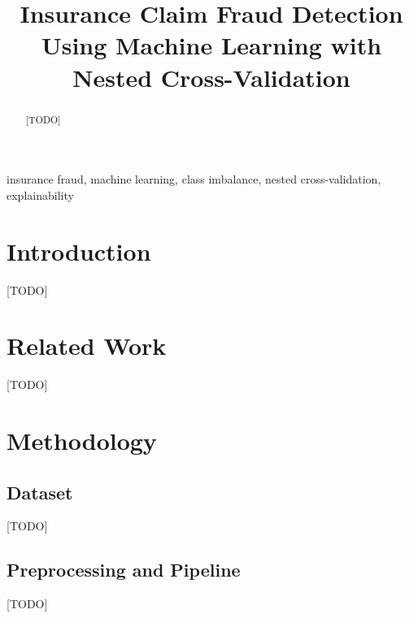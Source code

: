\documentclass[conference]{IEEEtran}
\begin{document}
\title{Insurance Claim Fraud Detection Using Machine Learning with Nested Cross-Validation}
\author{
}
\maketitle

\begin{abstract}
[TODO]
\end{abstract}
\begin{IEEEkeywords}
insurance fraud, machine learning, class imbalance, nested cross-validation, explainability
\end{IEEEkeywords}

\section{Introduction}
[TODO]

\section{Related Work}
[TODO] \cite{ref1}


\section{Methodology}
\subsection{Dataset}
[TODO]
\subsection{Preprocessing and Pipeline}
[TODO]
\end{document}
